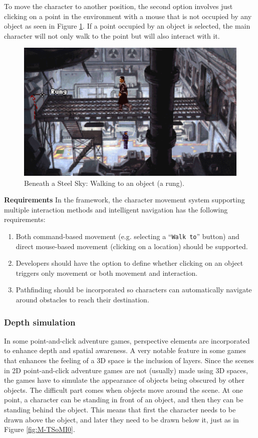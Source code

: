 To move the character to another position, the second option involves just clicking on a point in the environment with a mouse that is not occupied by any object as seen in Figure \ref{fig:M-BaSS}. If a point occupied by an object is selected, the main character will not only walk to the point but will also interact with it.

\begin{figure}[H]
\centering
\includegraphics[width=.8\linewidth]{img/M-BaSS.png}
\caption{Beneath a Steel Sky: Walking to an object (a rung).}
\label{fig:M-BaSS}
\end{figure}

\textbf{Requirements} \quad In the framework, the character movement system supporting multiple interaction methods and intelligent navigation has the following requirements:

\begin{enumerate}[label=\color{teal}\textbf{R{\arabic*}},resume]
  \item \label{intro:req:com+mouse_move} Both command-based movement (e.g. selecting a “\texttt{Walk to}” button) and direct mouse-based movement (clicking on a location) should be supported.
  \item \label{intro:req:mox_move} Developers should have the option to define whether clicking on an object triggers only movement or both movement and interaction.
  \item \label{intro:req:pathfinding}Pathfinding should be incorporated so characters can automatically navigate around obstacles to reach their destination.
\end{enumerate}

\subsubsection{Depth simulation}
In some point-and-click adventure games, perspective elements are incorporated to enhance depth and spatial awareness. 
A very notable feature in some games that enhances the feeling of a 3D space is the inclusion of layers. Since the scenes in 2D point-and-click adventure games are not (usually) made using 3D spaces, the games have to simulate the appearance of objects being obscured by other objects. The difficult part comes when objects move around the scene. At one point, a character can be standing in front of an object, and then they can be standing behind the object. This means that first the character needs to be drawn above the object, and later they need to be drawn below it, just as in Figure \ref{fig:M-TSoMI0}.

